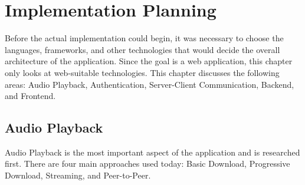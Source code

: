 \chapter{Implementation Planning}\label{ch:planning}

Before the actual implementation could begin, it was necessary to choose the languages,
frameworks, and other technologies that would decide the overall architecture of the application.
Since the goal is a web application, this chapter only looks at web-suitable technologies.
This chapter discusses the following areas: Audio Playback, Authentication,
Server-Client Communication, Backend, and Frontend.


\section{Audio Playback}
Audio Playback is the most important aspect of the application and is researched first.
There are four main approaches used today: Basic Download, Progressive Download, Streaming, and Peer-to-Peer.

